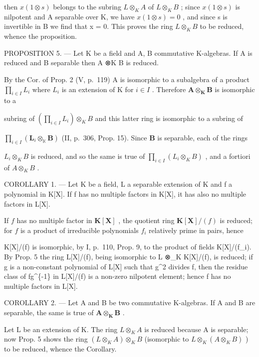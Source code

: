 then \(x(1 \otimes s)\) belongs to the subring \(L \otimes_{K} A\) of \(L \otimes_{K} B\) ; since \(x(1 \otimes s)\) is nilpotent and A separable over K, we have \(x(1 \otimes s) = 0\) , and since s is invertible in B we find that x = 0. This proves the ring \(L \otimes_{K} B\) to be reduced, whence the proposition.

PROPOSITION 5. --- Let K be a field and A, B commutative K-algebras. If A is reduced and B separable then A ⊗K B is reduced.

By the Cor. of Prop. 2 (V, p.~119) A is isomorphic to a subalgebra of a product \(\prod_{i\in I}L_i\) where \(L_{i}\) is an extension of K for \(i\in I\) . Therefore \(\mathbf{A}\otimes_{\mathbf{K}}\mathbf{B}\) is isomorphic to a

subring of \(\left(\prod_{i\in I}L_i\right)\otimes_K B\) and this latter ring is isomorphic to a subring of

\(\prod_{i\in I}(\mathbf{L}_i\otimes_{\mathbb{K}}\mathbf{B})\) (II, p.~306, Prop. 15). Since \(\mathbf{B}\) is separable, each of the rings

\(L_{i} \otimes_{K} B\) is reduced, and so the same is true of \(\prod_{i \in I} (L_{i} \otimes_{K} B)\) , and a fortiori of \(A \otimes_{K} B\) .

COROLLARY 1. --- Let K be a field, L a separable extension of K and f a polynomial in K{[}X{]}. If f has no multiple factors in K{[}X{]}, it has also no multiple factors in L{[}X{]}.

If \(f\) has no multiple factor in \(\mathbf{K}[\mathbf{X}]\) , the quotient ring \(\mathbf{K}[\mathbf{X}] / (f)\) is reduced; for \(f\) is a product of irreducible polynomials \(f_i\) relatively prime in pairs, hence

K{[}X{]}/(f) is isomorphic, by I, p.~110, Prop. 9, to the product of fields K{[}X{]}/(f\_i). By Prop. 5 the ring L{[}X{]}/(f), being isomorphic to L ⊗\_K K{[}X{]}/(f), is reduced; if g is a non-constant polynomial of L{[}X{]} such that g\^{}2 divides f, then the residue class of fg\^{}\{-1\} in L{[}X{]}/(f) is a non-zero nilpotent element; hence f has no multiple factors in L{[}X{]}.

COROLLARY 2. --- Let A and B be two commutative K-algebras. If A and B are separable, the same is true of \(\mathbf{A} \otimes_{\mathbf{K}} \mathbf{B}\) .

Let L be an extension of K. The ring \(L \otimes_{K} A\) is reduced because A is separable; now Prop. 5 shows the ring \((L \otimes_{K} A) \otimes_{K} B\) (isomorphic to \(L \otimes_{K} (A \otimes_{K} B)\) ) to be reduced, whence the Corollary.


